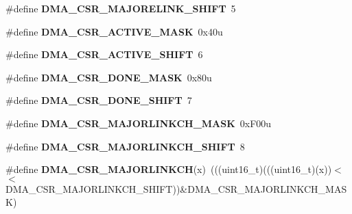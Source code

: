 \begin{DoxyCompactItemize}
\item 
\#define {\bfseries D\+M\+A\+\_\+\+C\+S\+R\+\_\+\+M\+A\+J\+O\+R\+E\+L\+I\+N\+K\+\_\+\+S\+H\+I\+FT}~5\hypertarget{group__DMA__Register__Masks_ga661ffd80f2647e1b9494de637a8a89bf}{}\label{group__DMA__Register__Masks_ga661ffd80f2647e1b9494de637a8a89bf}

\item 
\#define {\bfseries D\+M\+A\+\_\+\+C\+S\+R\+\_\+\+A\+C\+T\+I\+V\+E\+\_\+\+M\+A\+SK}~0x40u\hypertarget{group__DMA__Register__Masks_ga1e57ad208a3340d3f00b4470e5d039ff}{}\label{group__DMA__Register__Masks_ga1e57ad208a3340d3f00b4470e5d039ff}

\item 
\#define {\bfseries D\+M\+A\+\_\+\+C\+S\+R\+\_\+\+A\+C\+T\+I\+V\+E\+\_\+\+S\+H\+I\+FT}~6\hypertarget{group__DMA__Register__Masks_ga74b734e2edf221545bb66ade093a8875}{}\label{group__DMA__Register__Masks_ga74b734e2edf221545bb66ade093a8875}

\item 
\#define {\bfseries D\+M\+A\+\_\+\+C\+S\+R\+\_\+\+D\+O\+N\+E\+\_\+\+M\+A\+SK}~0x80u\hypertarget{group__DMA__Register__Masks_ga63a7af3b93217908bd0f7e6aa569b0b5}{}\label{group__DMA__Register__Masks_ga63a7af3b93217908bd0f7e6aa569b0b5}

\item 
\#define {\bfseries D\+M\+A\+\_\+\+C\+S\+R\+\_\+\+D\+O\+N\+E\+\_\+\+S\+H\+I\+FT}~7\hypertarget{group__DMA__Register__Masks_gacb03d2516c82508167b19a28d81055a3}{}\label{group__DMA__Register__Masks_gacb03d2516c82508167b19a28d81055a3}

\item 
\#define {\bfseries D\+M\+A\+\_\+\+C\+S\+R\+\_\+\+M\+A\+J\+O\+R\+L\+I\+N\+K\+C\+H\+\_\+\+M\+A\+SK}~0x\+F00u\hypertarget{group__DMA__Register__Masks_ga46d684508f50948c307efc8c3411345f}{}\label{group__DMA__Register__Masks_ga46d684508f50948c307efc8c3411345f}

\item 
\#define {\bfseries D\+M\+A\+\_\+\+C\+S\+R\+\_\+\+M\+A\+J\+O\+R\+L\+I\+N\+K\+C\+H\+\_\+\+S\+H\+I\+FT}~8\hypertarget{group__DMA__Register__Masks_gab34f787f2b2a3a927614699cfe50051d}{}\label{group__DMA__Register__Masks_gab34f787f2b2a3a927614699cfe50051d}

\item 
\#define {\bfseries D\+M\+A\+\_\+\+C\+S\+R\+\_\+\+M\+A\+J\+O\+R\+L\+I\+N\+K\+CH}(x)~(((uint16\+\_\+t)(((uint16\+\_\+t)(x))$<$$<$D\+M\+A\+\_\+\+C\+S\+R\+\_\+\+M\+A\+J\+O\+R\+L\+I\+N\+K\+C\+H\+\_\+\+S\+H\+I\+FT))\&D\+M\+A\+\_\+\+C\+S\+R\+\_\+\+M\+A\+J\+O\+R\+L\+I\+N\+K\+C\+H\+\_\+\+M\+A\+SK)\hypertarget{group__DMA__Register__Masks_ga6215f32eef477970761eb917884b6fa7}{}\label{group__DMA__Register__Masks_ga6215f32eef477970761eb917884b6fa7}


\end{DoxyCompactItemize}
